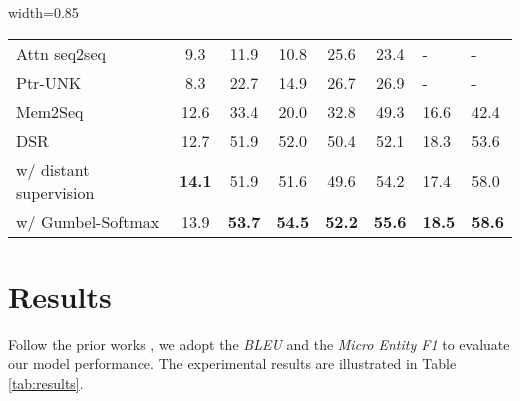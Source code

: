 \documentclass[11pt,a4paper]{article}
\begin{document}
\begin{table*}[ht]
\begin{adjustbox}{width=0.85\textwidth}
\begin{tabular}{l||ccccc||ll}
		Attn seq2seq \cite{luong-etal-2015-effective}                                                  & 9.3      & 11.9  & 10.8                                                &     25.6                                                 &   23.4          & -    & -                                 \\
		Ptr-UNK \cite{P16-1014}                                                  & 8.3      & 22.7  & 14.9                                                &     26.7                                                 &   26.9          & -    & -                                  \\
		Mem2Seq    \cite{madotto2018mem2seq}                                                        & 12.6    & 33.4   &                20.0                                           &        32.8                                              & 49.3             & 16.6    &   42.4                             \\
		DSR
		\cite{wen2018sequence}                                             &  12.7    & 51.9   &      52.0                                                     & 50.4                                                     & 52.1            &   18.3   &    53.6                     \\ 
		\hline
w/ distant supervision  & {\bf 14.1}   & {51.9}     & {51.6}   & {49.6}                                                         &    {54.2}                                                 &  17.4  &58.0                                 \\  
		w/ Gumbel-Softmax & {13.9}   & {\bf 53.7}     & {\bf 54.5}   & {\bf 52.2}                                                         &    {\bf 55.6}                                                 & {\bf 18.5}    &\textbf{58.6 }                                  \\   \hline                  
	\end{tabular}
\end{adjustbox}
	\caption{Comparison of our model with baselines} \label{tab:results}
	\vspace{-0.3cm}
\end{table*}

\section{Results}
  Follow the prior works \cite{eric:2017:SIGDial,madotto2018mem2seq,wen2018sequence}, we adopt the \textit{BLEU} and the \textit{Micro Entity F1} to evaluate our model performance.
The experimental results are illustrated in Table~ \ref{tab:results}. 
 
\end{document}

